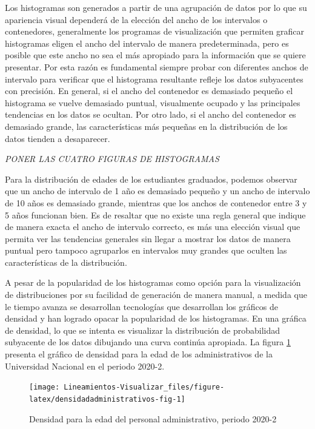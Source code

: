 \documentclass[
]{book}
\begin{document}
Los histogramas son generados a partir de una agrupación de datos por lo que su apariencia visual dependerá de la elección del ancho de los intervalos o contenedores, generalmente los programas de visualización que permiten graficar histogramas eligen el ancho del intervalo de manera predeterminada, pero es posible que este ancho no sea el más apropiado para la información que se quiere presentar. Por esta razón es fundamental siempre probar con diferentes anchos de intervalo para verificar que el histograma resultante refleje los datos subyacentes con precisión. En general, si el ancho del contenedor es demasiado pequeño el histograma se vuelve demasiado puntual, visualmente ocupado y las principales tendencias en los datos se ocultan. Por otro lado, si el ancho del contenedor es demasiado grande, las características más pequeñas en la distribución de los datos tienden a desaparecer.

\emph{PONER LAS CUATRO FIGURAS DE HISTOGRAMAS}

Para la distribución de edades de los estudiantes graduados, podemos observar que un ancho de intervalo de 1 año es demasiado pequeño y un ancho de intervalo de 10 años es demasiado grande, mientras que los anchos de contenedor entre 3 y 5 años funcionan bien. Es de resaltar que no existe una regla general que indique de manera exacta el ancho de intervalo correcto, es más una elección visual que permita ver las tendencias generales sin llegar a mostrar los datos de manera puntual pero tampoco agruparlos en intervalos muy grandes que oculten las características de la distribución.

A pesar de la popularidad de los histogramas como opción para la visualización de distribuciones por su facilidad de generación de manera manual, a medida que le tiempo avanza se desarrollan tecnologías que desarrollan los gráficos de densidad y han logrado opacar la popularidad de los histogramas. En una gráfica de densidad, lo que se intenta es visualizar la distribución de probabilidad subyacente de los datos dibujando una curva continúa apropiada. La figura \ref{fig:densidadadministrativos-fig} presenta el gráfico de densidad para la edad de los administrativos de la Universidad Nacional en el periodo 2020-2.

\begin{figure}

{\centering \texttt{[image: Lineamientos-Visualizar\_files/figure-latex/densidadadministrativos-fig-1]} 

}

\caption{Densidad para la edad del personal administrativo, periodo 2020-2}\label{fig:densidadadministrativos-fig}
\end{figure}
\end{document}
